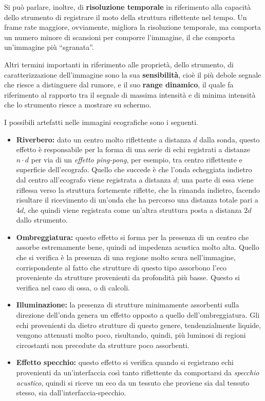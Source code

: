 \documentclass[11pt, a4paper]{scrartcl}
\theoremstyle{style}
\theoremstyle{style1}
\numberwithin{equation}{subsection}
\begin{document}
Si pu\`o parlare, inoltre, di \textbf{risoluzione temporale} in riferimento alla capacit\`a dello strumento di registrare il moto della struttura riflettente nel tempo.
Un frame rate maggiore, ovviamente, migliora la risoluzione temporale, ma comporta un numero minore di scansioni per comporre l'immagine, il che comporta un'immagine pi\`u ``sgranata''.

Altri termini importanti in riferimento alle propriet\`a, dello strumento, di caratterizzazione dell'immagine sono la sua \textbf{sensibilit\`a}, cio\`e il pi\`u debole segnale che riesce a distinguere dal rumore, e il suo \textbf{range dinamico}, il quale fa riferimento al rapporto tra il segnale di massima intensit\`a e di minima intensit\`a che lo strumento riesce a mostrare su schermo.

I possibili artefatti nelle immagini ecografiche sono i seguenti.
\begin{itemize}
		\item \textbf{Riverbero:} dato un centro molto riflettente a distanza $d$ dalla sonda, questo effetto \`e responsabile per la forma di una serie di echi registrati a distanze $n\cdot d$ per via di un \textit{effetto ping-pong}, per esempio, tra centro riflettente e superficie dell'ecografo.
			Quello che succede \`e che l'onda echeggiata indietro dal centro all'ecografo viene registrata a distanza $d$; una parte di essa viene riflessa verso la struttura fortemente riflette, che la rimanda indietro, facendo risultare il ricevimento di un'onda che ha percorso una distanza totale pari a $4d$, che quindi viene registrata come un'altra struttura posta a distanza $2d$ dallo strumento.
		\item \textbf{Ombreggiatura:} questo effetto si forma per la presenza di un centro che assorbe estremamente bene, quindi ad impedenza acustica molto alta. 
			Quello che si verifica \`e la presenza di una regione molto scura nell'immagine, corrispondente al fatto che strutture di questo tipo assorbono l'eco proveniente da strutture provenienti da profondit\`a pi\`u basse.
			Questo si verifica nel caso di ossa, o di calcoli.
		\item \textbf{Illuminazione:} la presenza di strutture minimamente assorbenti sulla direzione dell'onda genera un effetto opposto a quello dell'ombreggiatura. 
			Gli echi provenienti da dietro strutture di questo genere, tendenzialmente liquide, vengono attenuati molto poco, risultando, quindi, pi\`u luminosi di regioni circostanti non precedute da strutture poco assorbenti.
		\item \textbf{Effetto specchio:} questo effetto si verifica quando si registrano echi provenienti da un'interfaccia cos\`i tanto riflettente da comportarsi da \textit{specchio acustico}, quindi si riceve un eco da un tessuto che proviene sia dal tessuto stesso, sia dall'interfaccia-specchio.
\end{itemize}
\end{document}
